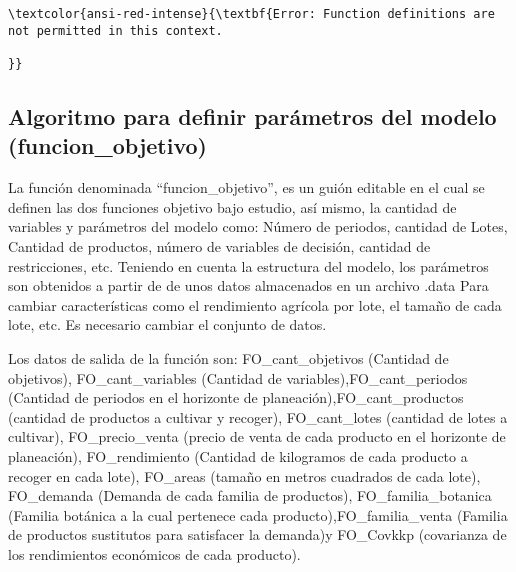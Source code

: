 \documentclass[11pt]{article}
\begin{document}
    \begin{Verbatim}[commandchars=\\\{\}]
\textcolor{ansi-red-intense}{\textbf{Error: Function definitions are not permitted in this context.

}}
    \end{Verbatim}

    \hypertarget{algoritmo-para-definir-paruxe1metros-del-modelo-funcion_objetivo}{%
\subsection{Algoritmo para definir parámetros del modelo
(funcion\_objetivo)}\label{algoritmo-para-definir-paruxe1metros-del-modelo-funcion_objetivo}}

La función denominada ``funcion\_objetivo'', es un guión editable en el
cual se definen las dos funciones objetivo bajo estudio, así mismo, la
cantidad de variables y parámetros del modelo como: Número de periodos,
cantidad de Lotes, Cantidad de productos, número de variables de
decisión, cantidad de restricciones, etc. Teniendo en cuenta la
estructura del modelo, los parámetros son obtenidos a partir de de unos
datos almacenados en un archivo .data Para cambiar características como
el rendimiento agrícola por lote, el tamaño de cada lote, etc. Es
necesario cambiar el conjunto de datos.

Los datos de salida de la función son: FO\_cant\_objetivos (Cantidad de
objetivos), FO\_cant\_variables (Cantidad de
variables),FO\_cant\_periodos (Cantidad de periodos en el horizonte de
planeación),FO\_cant\_productos (cantidad de productos a cultivar y
recoger), FO\_cant\_lotes (cantidad de lotes a cultivar),
FO\_precio\_venta (precio de venta de cada producto en el horizonte de
planeación), FO\_rendimiento (Cantidad de kilogramos de cada producto a
recoger en cada lote), FO\_areas (tamaño en metros cuadrados de cada
lote), FO\_demanda (Demanda de cada familia de productos),
FO\_familia\_botanica (Familia botánica a la cual pertenece cada
producto),FO\_familia\_venta (Familia de productos sustitutos para
satisfacer la demanda)y FO\_Covkkp (covarianza de los rendimientos
económicos de cada producto).
\end{document}
